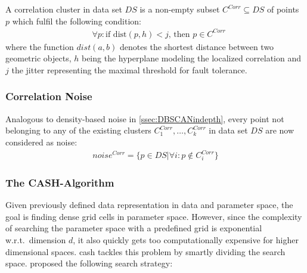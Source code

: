 A correlation cluster in data set $DS$ is a non-empty subset $C^{Corr} \subseteq DS$ of points $p$ which fulfil the following condition:
\begin{align}\label{eq:pointtohyplane}
    &\forall p: \text{if } \text{dist}(p,h) < j \text{, then } p \in C^{Corr}
\end{align}
where the function $dist(a,b)$ denotes the shortest distance between two geometric objects, $h$ being the hyperplane modeling the localized correlation and $j$ the jitter representing the maximal threshold for fault tolerance.


\subsubsection*{Correlation Noise}
Analogous to density-based noise in \autoref{ssec:DBSCANindepth}, every point not belonging to any of the existing clusters $C^{Corr}_1, \dotsc, C^{Corr}_k$ in data set $DS$ are now considered as noise: 
\begin{align}
    noise^{Corr} = \{p \in  DS | \forall i : p \notin C^{Corr}_i\}
\end{align}

\subsubsection*{The CASH-Algorithm}
Given previously defined data representation in data and parameter space, the goal is finding dense grid cells in parameter space. However, since the complexity of searching the parameter space with a predefined grid is exponential w.r.t.\ dimension $d$, it also quickly gets too computationally expensive for higher dimensional spaces. \gls{cash} tackles this problem by smartly dividing the search space. \citeauthor{CASHachtert2008robust} proposed the following search strategy:
\vspace{5mm}

